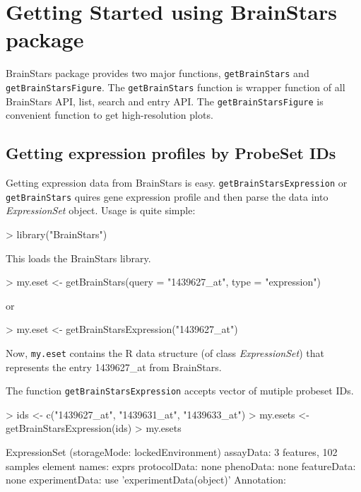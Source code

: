\documentclass[12pt,fullpage]{article}
\newcommand{\Rfunction}[1]{{\texttt{#1}}}
\newcommand{\Robject}[1]{{\texttt{#1}}}
\newcommand{\Rclass}[1]{{\textit{#1}}}
\begin{document}
\section{Getting Started using BrainStars package}
BrainStars package provides two major functions, \Rfunction{getBrainStars} and 
\Rfunction{getBrainStarsFigure}. The \Rfunction{getBrainStars} function is wrapper function of all BrainStars API, list, search and entry API. The \Rfunction{getBrainStarsFigure} is convenient function to get high-resolution plots.

\subsection{Getting expression profiles by ProbeSet IDs}
Getting expression data from BrainStars is easy.  \Rfunction{getBrainStarsExpression} or 
\Rfunction{getBrainStars} quires gene expression profile and then parse the data into 
\Rclass{ExpressionSet} object.  Usage is quite simple:

\begin{Schunk}
\begin{Sinput}
> library("BrainStars")
\end{Sinput}
\end{Schunk}

This loads the BrainStars library.

\begin{Schunk}
\begin{Sinput}
> my.eset <- getBrainStars(query = "1439627_at", type = "expression")
\end{Sinput}
\end{Schunk}
or
\begin{Schunk}
\begin{Sinput}
> my.eset <- getBrainStarsExpression("1439627_at")
\end{Sinput}
\end{Schunk}

Now, \Robject{my.eset} contains the R data structure (of class \Rclass{ExpressionSet}) that represents the entry 1439627\_at from BrainStars.

The function \Rfunction{getBrainStarsExpression} accepts vector of mutiple probeset IDs.
\begin{Schunk}
\begin{Sinput}
> ids <- c("1439627_at", "1439631_at", "1439633_at")
> my.esets <- getBrainStarsExpression(ids)
> my.esets
\end{Sinput}
\begin{Soutput}
ExpressionSet (storageMode: lockedEnvironment)
assayData: 3 features, 102 samples 
  element names: exprs 
protocolData: none
phenoData: none
featureData: none
experimentData: use 'experimentData(object)'
Annotation:  
\end{Soutput}
\end{Schunk}
\end{document}

